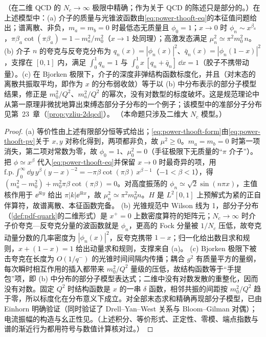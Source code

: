 \begin{proposition}\label{prop:power-thooft-model}
（在二维 QCD 的 $N_c\to\infty$ 极限中精确；作为关于 QCD 的陈述只是部分的。）在上述模型中：(a) 介子的质量与光锥波函数由\eqref{eq:power-thooft-eq}的本征值问题给出；谱离散、非负，$m_a=m_b=0$ 时最低态无质量且 $\phi_0=1$；$x\to0$ 时 $\phi_n\sim x^{\beta_a}$，$\pi\beta_a\cot(\pi\beta_a)=1-m_a^2/m_0^2$（$x\to1$ 处同理）；高激发态满足 $\mu_n^2\simeq\pi^2m_0^2\,n$。(b) 介子 $n$ 的夸克与反夸克分布为 $q_n(x)=|\phi_n(x)|^2$、$\bar q_n(x)=|\phi_n(1-x)|^2$，支撑在 $[0,1]$ 内，满足 $\int_0^1q_n=1$ 与 $\int_0^1x\,[q_n+\bar q_n]\,\dd x=1$（胶子不携带动量）。(c) 在 Bjorken 极限下，介子的深度非弹结构函数标度化，并且（对末态的离散共振取平均，即作为 $x$ 的分布弱收敛）等于以 (b) 中分布表示的部分子模型结果，修正是 $m_0^2/Q^2$、$m_a^2/Q^2$ 的幂次，没有对数型的标度破坏\cite{Einhorn1976}。这是规范理论中从第一原理非微扰地算出束缚态部分子分布的一个例子；该模型中的准部分子分布见第~23~章（\cref{prop:yzliu-2dqcd}）。
（本命题只涉及二维大 $N_c$ 模型。）
\end{proposition}

\begin{proof}
(a) 等价性由上述有限部分恒等式给出；\eqref{eq:power-thooft-form}由\eqref{eq:power-thooft-pv}关于 $x,y$ 对称化得到，两项都非负，故 $\mu^2\ge0$。$m_a=m_b=0$ 时第一项消失，第二项对常数为零，故 $\phi_0=1$、$\mu_0^2=0$（手征极限下无质量的“$\pi$ 介子”）。把 $\phi\simeq x^\beta$ 代入\eqref{eq:power-thooft-eq}并保留 $x\to0$ 时最奇异的项，用 $\mathrm{f.p.}\int_0^\infty\dd y\,y^\beta(y-x)^{-2}=-\pi\beta\cot(\pi\beta)\,x^{\beta-1}$（$-1<\beta<1$），得 $(m_a^2-m_0^2)+m_0^2\pi\beta\cot(\pi\beta)=0$。对高度振荡的 $\phi_n\simeq\sqrt2\sin(n\pi x)$，主值核作用于 $\ee^{\ii ky}$ 给出 $\pi|k|\ee^{\ii kx}$，故 $\mu_n^2\simeq\pi^2m_0^2n$。$H$ 是 $L^2[0,1]$ 上预解式为紧的正自伴算符，故谱离散、本征函数完备\cite{tHooft1974,Einhorn1976}。
(b) 光锥规范中 Wilson 线为 1，部分子分布（\cref{def:pdf-quark}的二维形式）是 $x^+=0$ 上数密度算符的矩阵元；$N_c\to\infty$ 时介子价夸克—反夸克分量的波函数就是 $\phi_n$，更高的 Fock 分量被 $1/N_c$ 压低\cite{Einhorn1976}，故夸克动量分数的几率密度为 $|\phi_n(x)|^2$，反夸克携带 $1-x$；归一化给出数目求和规则，$x+(1-x)=1$ 给出动量求和规则，支撑来自 (a)。
(c) Bjorken 极限下被击夸克在长度为 $O(1/q^-)$ 的光锥时间间隔内传播；耦合 $g^2$ 有质量平方的量纲，每次瞬时相互作用的插入都带来 $m_0^2/Q^2$ 量级的压低，故结构函数等于“手提包”项，即 (b) 中分布的部分子模型表达式；二维中没有对数发散的重整化，因而没有对数。固定 $Q^2$ 时结构函数是 $x$ 的一串 $\delta$ 函数，相邻共振的间距按 $m_0^2/Q^2$ 趋于零，所以标度化在分布意义下成立。对全部末态求和精确再现部分子模型，已由 Einhorn 明确验证（同时验证了 Drell--Yan--West 关系与 Bloom--Gilman 对偶）\cite{Einhorn1976}；电流振幅的构造与幺正性见\cite{CallanCooteGross1976}。（上述积分、等价形式、正定性、零模、端点指数与谱的渐近行为都用符号与数值计算核对过。）
\end{proof}

